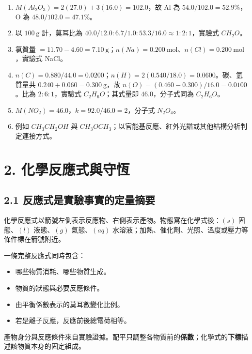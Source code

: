 \documentclass[11pt,a4paper]{article}
\providecommand{\tightlist}{%
  \setlength{\itemsep}{0pt}\setlength{\parskip}{0pt}}
\begin{document}
\begin{enumerate}
\def\labelenumi{\arabic{enumi}.}
\tightlist
\item
  \(M(Al_2O_3)=2(27.0)+3(16.0)=102.0\)，故 Al 為 \(54.0/102.0=52.9\%\)，O 為 \(48.0/102.0=47.1\%\)。
\item
  以 \(100\ \mathrm g\) 計，莫耳比為 \(40.0/12.0:6.7/1.0:53.3/16.0\approx1:2:1\)，實驗式 \(CH_2O\)。
\item
  氯質量 \(=11.70-4.60=7.10\ \mathrm g\)；\(n(Na)=0.200\ \mathrm{mol}\)、\(n(Cl)=0.200\ \mathrm{mol}\)，實驗式 NaCl。
\item
  \(n(C)=0.880/44.0=0.0200\)；\(n(H)=2(0.540/18.0)=0.0600\)。碳、氫質量共 \(0.240+0.060=0.300\ \mathrm g\)，故 \(n(O)=(0.460-0.300)/16.0=0.0100\)。比為 \(2:6:1\)，實驗式 \(C_2H_6O\)；其式量即 \(46.0\)，分子式同為 \(C_2H_6O\)。
\item
  \(M(NO_2)=46.0\)，\(k=92.0/46.0=2\)，分子式 \(N_2O_4\)。
\item
  例如 \(CH_3CH_2OH\) 與 \(CH_3OCH_3\)；以官能基反應、紅外光譜或其他結構分析判定連接方式。
\end{enumerate}

\section{2. 化學反應式與守恆}\label{ux5316ux5b78ux53cdux61c9ux5f0fux8207ux5b88ux6046}

\subsection{2.1 反應式是實驗事實的定量摘要}\label{ux53cdux61c9ux5f0fux662fux5be6ux9a57ux4e8bux5be6ux7684ux5b9aux91cfux6458ux8981}

化學反應式以箭號左側表示反應物、右側表示產物。物態寫在化學式後：\((s)\) 固態、\((l)\) 液態、\((g)\) 氣態、\((aq)\) 水溶液；加熱、催化劑、光照、溫度或壓力等條件標在箭號附近。

一條完整反應式同時包含：

\begin{itemize}
\tightlist
\item
  哪些物質消耗、哪些物質生成。
\item
  物質的狀態與必要反應條件。
\item
  由平衡係數表示的莫耳數變化比例。
\item
  若是離子反應，反應前後總電荷相等。
\end{itemize}

產物身分與反應條件來自實驗證據。配平只調整各物質前的\textbf{係數}；化學式的\textbf{下標}描述該物質本身的固定組成。
\end{document}
